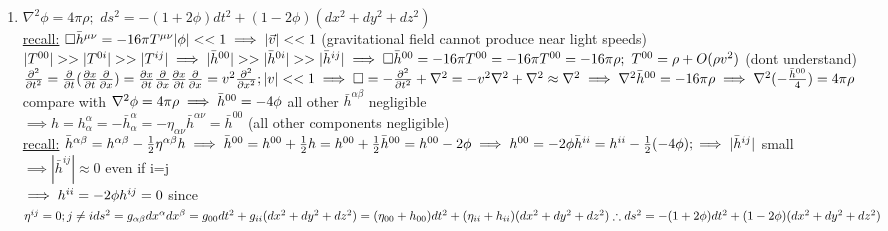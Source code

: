 \documentclass[12pt]{amsart}
\begin{document}
\begin{enumerate}
\item \underline{$\nabla^2 \phi = 4 \pi \rho;\,\, ds^2 = -(1+2 \phi) dt^2 +(1-2 \phi)(dx^2 + dy^2 + dz^2)$}\\
\underline{recall:} $\Box \bar{h}^{\mu \nu} = -16 \pi T^{\mu \nu}\\
|\phi|<<1 \implies |\vec{v}|<<1$ (gravitational field cannot produce near light speeds)\\
$|T^{00}|>>|T^{0i}|>>|T^{ij}|\\
\implies | \bar{h}^{00}|>>|\bar{h}^{0i}|>>|\bar{h}^{ij}|\\
\implies \Box \bar{h}^{00}=-16 \pi T^{00}=-16 \pi T^{00} = -16 \pi \rho;\,\, T^{00} = \rho + O(\rho v^2) $ (dont understand)\\
$\frac{\partial^2}{\partial t^2}=\frac{\partial}{\partial t} ( \frac{\partial x}{\partial t} \frac{\partial}{\partial x})=\frac{\partial x}{\partial t}\frac{\partial}{\partial x} \frac{\partial x}{\partial t} \frac{\partial}{\partial x}=v^2 \frac{\partial^2}{\partial x^2}; |v|<<1 \implies \Box=-\frac{\partial^2}{\partial t^2} + \nabla^2=-v^2 \nabla^2 + \nabla^2 \approx \nabla^2 \implies \nabla^2 \bar{h}^{00}=-16 \pi \rho \implies \nabla^2(-\frac{\bar{h}^{00}}{4})=4 \pi \rho\\$
compare with $\nabla ^2 \phi = 4 \pi \rho \implies \bar{h}^{00}=-4 \phi \\$
all other $ \bar{h}^{\alpha \beta}$ negligible\\
$\implies h=h_{\alpha}^{\alpha} = - \bar{h}_{\alpha}^{\alpha}= - \eta_{\alpha \nu} \bar{h}^{\alpha \nu}= \bar{h}^{00}$ (all other components negligible)\\
\underline{recall:} $\bar{h}^{\alpha \beta} = h^{\alpha \beta} - \frac{1}{2} \eta^{\alpha \beta} h\\
\implies \bar{h}^{00}= h^{00} + \frac{1}{2} h = h^{00} + \frac{1}{2} \bar{h}^{00} = h^{00} - 2 \phi\\
\implies h^{00} = -2 \phi \\
\bar{h}^{ii} = h^{ii}- \frac{1}{2} ( -  4 \phi); \implies |\bar{h}^{ij}|$ small $\implies |\bar{h}^{ij}| \approx 0$ even if i=j\\
$\implies h^{ii} = -2 \phi\\
h^{ij} = 0$ since $\eta^{ij}=0; j \neq i\\
ds^2 =g_{\alpha \beta} dx^{\alpha} dx^{\beta}=g_{00} dt^2 + g_{ii}(dx^2 + dy^2 + dz^2)\\
=(\eta_{00} + h_{00}) dt^2 + (\eta_{ii} + h_{ii})(dx^2+dy^2+dz^2)\\
\therefore ds^2= -(1+2 \phi) dt^2 + (1-2 \phi)( dx^2 + dy^2 + dz^2)$



\end{enumerate}
\end{document}
